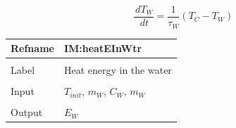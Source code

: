 \documentclass[12pt]{article}
\begin{document}
\begin{displaymath}
\frac{\,d{T_{W}}}{\,dt}=\frac{1}{{τ_{W}}} \left({T_{C}}-{T_{W}}\right)
\end{displaymath}
\vspace{\baselineskip}
\noindent
\begin{minipage}{\textwidth}
\begin{tabular}{>{\raggedright}p{}>{\raggedright\arraybackslash}p{}}
\toprule \textbf{Refname} & \textbf{IM:heatEInWtr}
\label{IM:heatEInWtr}
\\ \midrule \\
Label & Heat energy in the water
        
\\ \midrule \\
Input & ${T_{init}}$, ${m_{W}}$, ${C_{W}}$, ${m_{W}}$
        
\\ \midrule \\
Output & ${E_{W}}$
         

\end{tabular}
\end{minipage}
\end{document}
